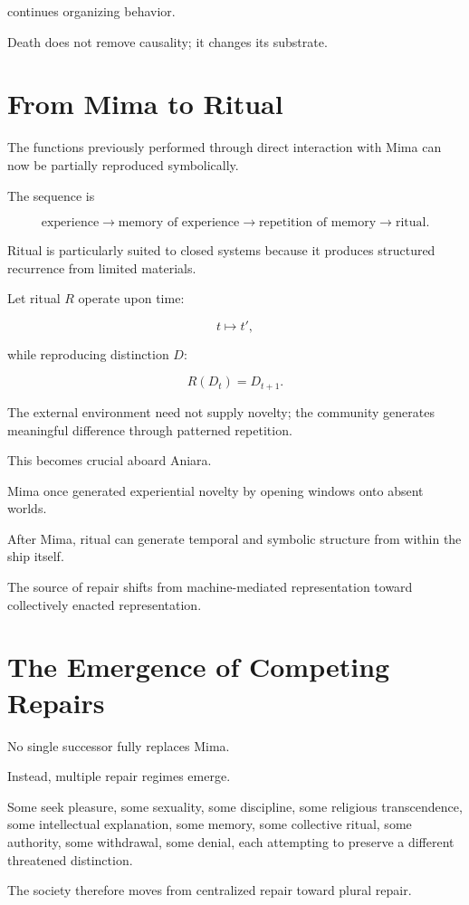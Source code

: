 \documentclass[11pt,oneside]{book}
\theoremstyle{definition}
\theoremstyle{remark}
\begin{document}
continues organizing behavior.

Death does not remove causality; it changes its substrate.

\section{From Mima to Ritual}

The functions previously performed through direct interaction with Mima can now be partially reproduced symbolically.

The sequence is

\[
\text{experience}
\rightarrow
\text{memory of experience}
\rightarrow
\text{repetition of memory}
\rightarrow
\text{ritual}.
\]

Ritual is particularly suited to closed systems because it produces structured recurrence from limited materials.

Let ritual \(R\) operate upon time:

\[
t\mapsto t',
\]

while reproducing distinction \(D\):

\[
R(D_t)=D_{t+1}.
\]

The external environment need not supply novelty; the community generates meaningful difference through patterned repetition.

This becomes crucial aboard Aniara.

Mima once generated experiential novelty by opening windows onto absent worlds.

After Mima, ritual can generate temporal and symbolic structure from within the ship itself.

The source of repair shifts from machine-mediated representation toward collectively enacted representation.

\section{The Emergence of Competing Repairs}

No single successor fully replaces Mima.

Instead, multiple repair regimes emerge.

Some seek pleasure, some sexuality, some discipline, some religious transcendence, some intellectual explanation, some memory, some collective ritual, some authority, some withdrawal, some denial, each attempting to preserve a different threatened distinction.

The society therefore moves from centralized repair toward plural repair.
\end{document}
